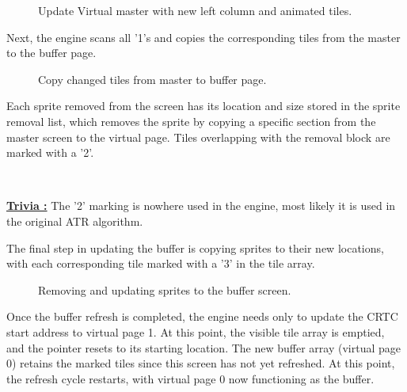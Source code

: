 \documentclass[book.tex]{subfiles}
\begin{document}
\begin{figure}[H]
\centering
 \caption{Update Virtual master with new left column and animated tiles.}
 \label{fig:kc4_6_step1}
\end{figure}

\pagebreak
Next, the engine scans all '1's and copies the corresponding tiles from the master to the buffer page. \\


\begin{figure}[H]
\centering
 \caption{Copy changed tiles from master to buffer page.}
 \label{fig:kc4_6_step2}
\end{figure}

\pagebreak
Each sprite removed from the screen has its location and size stored in the sprite removal list, which removes the sprite by copying a specific section from the master screen to the virtual page. Tiles overlapping with the removal block are marked with a '2'.\\

\par
\begin{minipage}{\textwidth}
  
  \end{minipage}
  \label{block_removal}
\\
\par
\begin{minipage}{\textwidth}
  
  \end{minipage}
  \label{block_removal}

\par
\textbf{\underline{Trivia :}} The '2' marking is nowhere used in the engine, most likely it is used in the original ATR algorithm.\\
  \par
  
\pagebreak
The final step in updating the buffer is copying sprites to their new locations, with each corresponding tile marked with a '3' in the tile array. 

\begin{figure}[H]
\centering
 \caption{Removing and updating sprites to the buffer screen.}
 \label{fig:kc4_6_step4}
\end{figure}

\pagebreak
Once the buffer refresh is completed, the engine needs only to update the CRTC start address to virtual page 1. At this point, the visible tile array is emptied, and the pointer resets to its starting location. The new buffer array (virtual page 0) retains the marked tiles since this screen has not yet refreshed. At this point, the refresh cycle restarts, with virtual page 0 now functioning as the buffer. 
\end{document}
